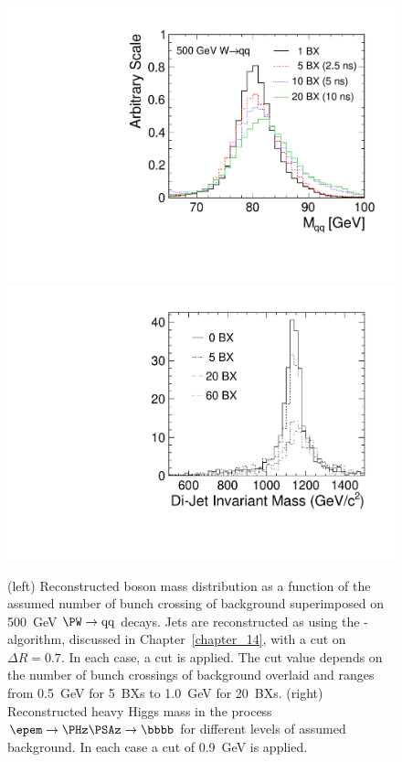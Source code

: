 \begin{figure}[hbt]
\centering
\includegraphics[width=0.49\linewidth]{../Chap3_ExpCond_PhysPerfsReqs/WTiming.pdf}
\includegraphics[width=0.49\linewidth]{../Chap3_ExpCond_PhysPerfsReqs/habx.pdf}
 \caption{(left) Reconstructed \PW boson mass distribution as a function
   of the assumed number of bunch crossing of background superimposed on 
   500~GeV $\PW\rightarrow \mathrm{qq}$ decays. Jets are reconstructed as using the \kT-algorithm,
   discussed in Chapter~\ref{chapter_14}, with a cut on $\Delta R = 0.7$. In each case, a \pT cut is applied. The
    cut value depends on the number
    of bunch crossings of background overlaid and ranges from 0.5~GeV for 5~BXs to
    1.0~GeV for 20~BXs.   (right)  Reconstructed heavy Higgs mass in the process $\epem\rightarrow\PHz\PSAz\rightarrow \bbbb$
     for different levels of assumed background. In each case a \pT cut of 0.9~GeV is applied.
     \label{fig:chap3:wwReco}}
\end{figure}

